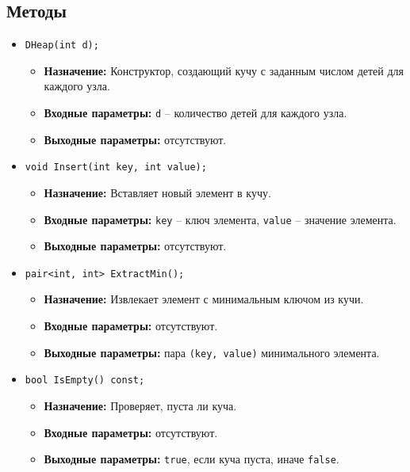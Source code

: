 \subsection*{Методы}
\begin{itemize}
    \item \texttt{DHeap(int d);}
    \begin{itemize}
        \item \textbf{Назначение:} Конструктор, создающий кучу с заданным числом детей для каждого узла.
        \item \textbf{Входные параметры:} \texttt{d} -- количество детей для каждого узла.
        \item \textbf{Выходные параметры:} отсутствуют.
    \end{itemize}

    \item \texttt{void Insert(int key, int value);}
    \begin{itemize}
        \item \textbf{Назначение:} Вставляет новый элемент в кучу.
        \item \textbf{Входные параметры:} \texttt{key} -- ключ элемента, \texttt{value} -- значение элемента.
        \item \textbf{Выходные параметры:} отсутствуют.
    \end{itemize}

    \item \texttt{pair<int, int> ExtractMin();}
    \begin{itemize}
        \item \textbf{Назначение:} Извлекает элемент с минимальным ключом из кучи.
        \item \textbf{Входные параметры:} отсутствуют.
        \item \textbf{Выходные параметры:} пара \texttt{(key, value)} минимального элемента.
    \end{itemize}

    \item \texttt{bool IsEmpty() const;}
    \begin{itemize}
        \item \textbf{Назначение:} Проверяет, пуста ли куча.
        \item \textbf{Входные параметры:} отсутствуют.
        \item \textbf{Выходные параметры:} \texttt{true}, если куча пуста, иначе \texttt{false}.
    \end{itemize}


\end{itemize}
